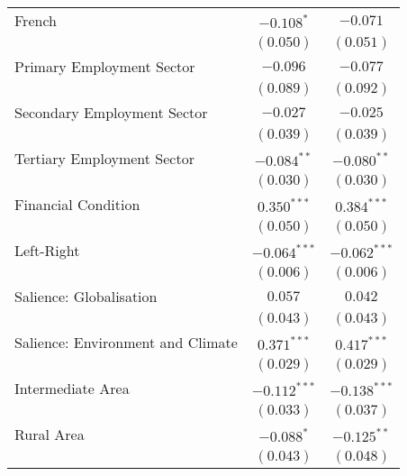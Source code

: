 \begin{center}
\begin{tiny}
\begin{longtable}{l@{} c@{} c@{}}
\quad French                                           & $-0.108^{*}$     & $-0.071$         \\
                                                       & $(0.050)$        & $(0.051)$        \\
\quad Primary Employment Sector                        & $-0.096$         & $-0.077$         \\
                                                       & $(0.089)$        & $(0.092)$        \\
\quad Secondary Employment Sector                      & $-0.027$         & $-0.025$         \\
                                                       & $(0.039)$        & $(0.039)$        \\
\quad Tertiary Employment Sector                       & $-0.084^{**}$    & $-0.080^{**}$    \\
                                                       & $(0.030)$        & $(0.030)$        \\
\quad Financial Condition                              & $0.350^{***}$    & $0.384^{***}$    \\
                                                       & $(0.050)$        & $(0.050)$        \\
\quad Left-Right                                       & $-0.064^{***}$   & $-0.062^{***}$   \\
                                                       & $(0.006)$        & $(0.006)$        \\
\quad Salience: Globalisation                          & $0.057$          & $0.042$          \\
                                                       & $(0.043)$        & $(0.043)$        \\
\quad Salience: Environment and Climate                & $0.371^{***}$    & $0.417^{***}$    \\
                                                       & $(0.029)$        & $(0.029)$        \\
Intermediate Area                                      & $-0.112^{***}$   & $-0.138^{***}$   \\
                                                       & $(0.033)$        & $(0.037)$        \\
Rural Area                                             & $-0.088^{*}$     & $-0.125^{**}$    \\
                                                       & $(0.043)$        & $(0.048)$        \\

\end{longtable}
\end{tiny}
\end{center}
